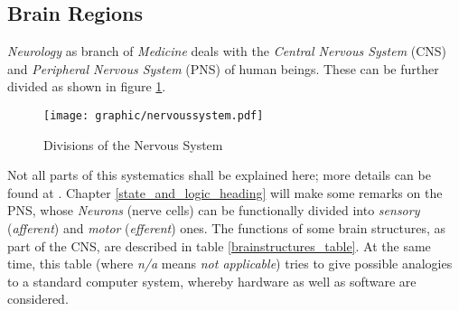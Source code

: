 %
%
%
%
%
%
%

\subsection{Brain Regions}
\label{brain_regions_heading}

\emph{Neurology} as branch of \emph{Medicine} deals with the
\emph{Central Nervous System} (CNS) and \emph{Peripheral Nervous System} (PNS)
of human beings. These can be further divided as shown in figure
\ref{nervoussystem_figure}.

\begin{figure}[ht]
    \begin{center}
        \texttt{[image: graphic/nervoussystem.pdf]}
        \caption{Divisions of the Nervous System \cite{adventuresinneuroanatomy}}
        \label{nervoussystem_figure}
    \end{center}
\end{figure}

Not all parts of this systematics shall be explained here; more details can be
found at \cite{pschyrembel}. Chapter \ref{state_and_logic_heading} will make
some remarks on the PNS, whose \emph{Neurons} (nerve cells) can be functionally
divided into \emph{sensory} (\emph{afferent}) and \emph{motor}
(\emph{efferent}) ones. The functions of some brain structures, as part of the
CNS, are described in table \ref{brainstructures_table}. At the same time, this
table (where \emph{n/a} means \emph{not applicable}) tries to give possible
analogies to a standard computer system, whereby hardware as well as software
are considered.

